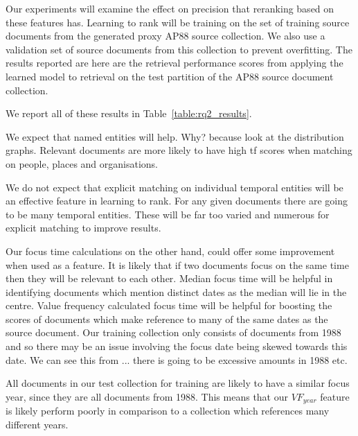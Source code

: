 \documentclass{mpaper}
\begin{document}
Our experiments will examine the effect on precision that reranking based on these features has. Learning to rank will be training on the set of training source documents from the generated proxy AP88 source collection. We also use a validation set of source documents from this collection to prevent overfitting.
The results reported are here are the retrieval performance scores from applying the learned model to retrieval on the test partition of the AP88 source document collection.

We report all of these results in Table~\ref{table:rq2_results}.

We expect that named entities will help.
Why? because look at the distribution graphs.
Relevant documents are more likely to have high tf scores when matching on people, places and organisations.

We do not expect that explicit matching on individual temporal entities will be an effective feature in learning to rank. For any given documents there are going to be many temporal entities. These will be far too varied and numerous for explicit matching to improve results.

Our focus time calculations on the other hand, could offer some improvement when used as a feature. It is likely that if two documents focus on the same time then they will be relevant to each other.
Median focus time will be helpful in identifying documents which mention distinct dates as the median will lie in the centre.
Value frequency calculated focus time will be helpful for boosting the scores of documents which make reference to many of the same dates as the source document.
Our training collection only consists of documents from 1988 and so there may be an issue involving the focus date being skewed towards this date.
We can see this from ... there is going to be excessive amounts in 1988 etc.

All documents in our test collection for training are likely to have a similar focus year, since they are all documents from 1988. This means that our $VF_{year}$ feature is likely perform poorly in comparison to a collection which references many different years.
\end{document}
